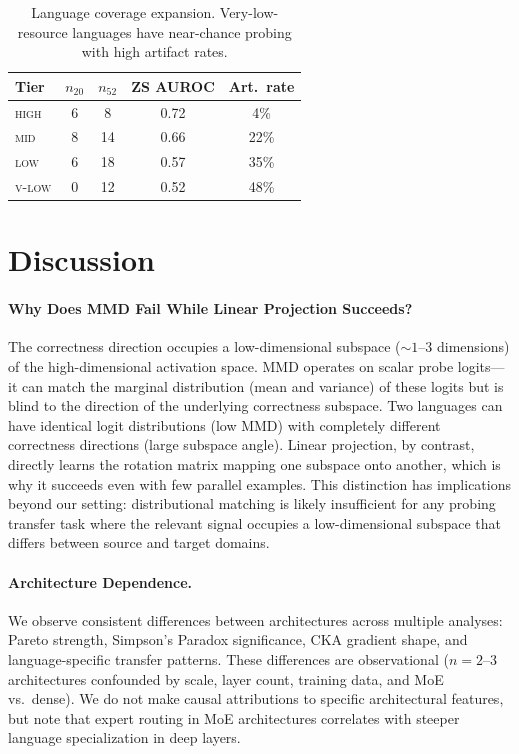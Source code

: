 \documentclass[11pt,a4paper]{article}
\newcommand{\auroc}{AUROC}
\begin{document}
\begin{table}[t]
\centering
\small
\begin{tabular}{lcccc}
\toprule
Tier & $n_{20}$ & $n_{52}$ & ZS \auroc{} & Art.\ rate \\
\midrule
\textsc{high} & 6 & 8 & 0.72 & 4\% \\
\textsc{mid}  & 8 & 14 & 0.66 & 22\% \\
\textsc{low}  & 6 & 18 & 0.57 & 35\% \\
\textsc{v-low} & 0 & 12 & 0.52 & 48\% \\
\bottomrule
\end{tabular}
\caption{Language coverage expansion. Very-low-resource languages have near-chance probing with high artifact rates.}
\label{tab:52lang}
\end{table}


\section{Discussion}

\paragraph{Why Does MMD Fail While Linear Projection Succeeds?}
The correctness direction occupies a low-dimensional subspace (${\sim}1$--3 dimensions) of the high-dimensional activation space. MMD operates on scalar probe logits---it can match the marginal distribution (mean and variance) of these logits but is blind to the direction of the underlying correctness subspace. Two languages can have identical logit distributions (low MMD) with completely different correctness directions (large subspace angle). Linear projection, by contrast, directly learns the rotation matrix mapping one subspace onto another, which is why it succeeds even with few parallel examples. This distinction has implications beyond our setting: distributional matching is likely insufficient for any probing transfer task where the relevant signal occupies a low-dimensional subspace that differs between source and target domains.

\paragraph{Architecture Dependence.}
We observe consistent differences between architectures across multiple analyses: Pareto strength, Simpson's Paradox significance, CKA gradient shape, and language-specific transfer patterns. These differences are observational ($n=2$--3 architectures confounded by scale, layer count, training data, and MoE vs.\ dense). We do not make causal attributions to specific architectural features, but note that expert routing in MoE architectures correlates with steeper language specialization in deep layers.
\end{document}
